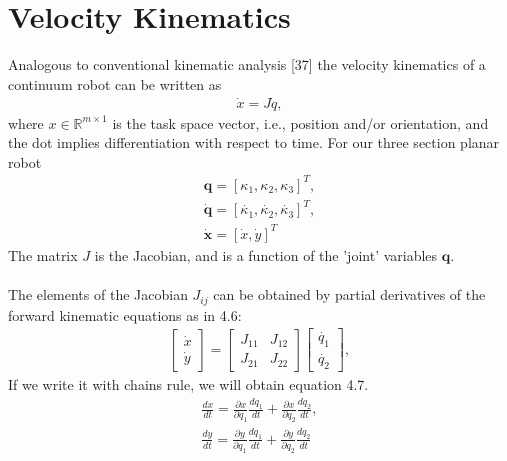 \documentclass[12pt,twoside,a4]{mwbk}
\begin{document}
\section{Velocity Kinematics}
Analogous to conventional kinematic analysis [37] the velocity kinematics of a continuum robot can be written as
\begin{subequations}
\begin{align}
    \dot{x} = J\dot{q},
\end{align}
\end{subequations}
where $x\in \mathbb{R}^{m\times 1}$ is the task space vector, i.e., position and/or orientation, and the dot implies differentiation with respect to time. For our three section planar robot
\begin{subequations}
\begin{align}
    \mathbf{q} = \left [ \kappa _1, \kappa _2, \kappa _3 \right ]^T, \\
    \mathbf{\dot{q}} = \left [ \dot{\kappa _1}, \dot{\kappa _2}, \dot{\kappa _3} \right ]^T, \\
    \mathbf{\dot{x}} = \left [ \dot{x}, \dot{y} \right ]^T
\end{align}
\end{subequations}
The matrix $J$ is the Jacobian, and is a function of the 'joint' variables $\mathbf{q}$.
\\ \\
The elements of the Jacobian $J_{ij}$ can be obtained by partial derivatives of the forward kinematic equations as in 4.6:
\begin{subequations}
\begin{align}
    \begin{bmatrix}
\dot{x}\\ 
\dot{y}
\end{bmatrix} = \begin{bmatrix}
J_{11} & J_{12} \\ 
J_{21} & J_{22}
\end{bmatrix} \begin{bmatrix}
\dot{q_1}\\ 
\dot{q_2}
\end{bmatrix},
\end{align}
\end{subequations}
If we write it with chains rule, we will obtain equation 4.7.
\begin{subequations}
\begin{align}
\frac{dx}{dt} = \frac{\partial x}{\partial q_1} \frac{d q_1}{dt} + \frac{\partial x}{\partial q_2} \frac{d q_2}{dt}, \\ 
\frac{dy}{dt} = \frac{\partial y}{\partial q_1} \frac{d q_1}{dt} + \frac{\partial y}{\partial q_2} \frac{d q_2}{dt}
\end{align}
\end{subequations}
\end{document}

